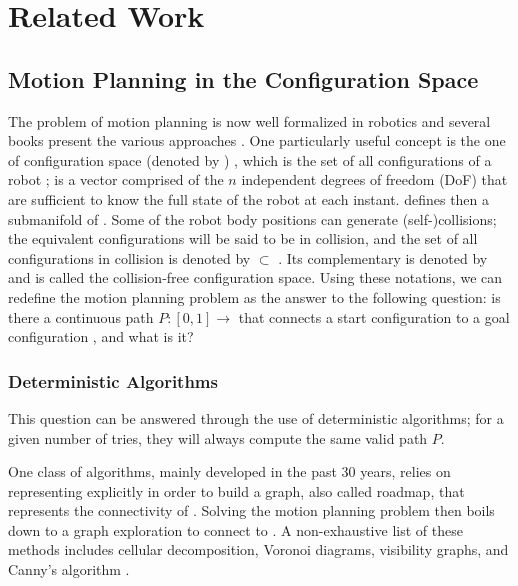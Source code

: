 \section{Related Work}
\label{sec:chap1-related-work}

\subsection{Motion Planning in the Configuration Space}
\label{subsec:chap1-motion-planning}

The problem of motion planning is now well formalized in robotics and
several books present the various approaches
\cite{lato91,chos05,lava06}. One particularly useful concept is the
one of configuration space (denoted by \cspace) \cite{loza83}, which
is the set of all configurations \config{} of a robot \robot; \config{} is
a vector comprised of the $n$ independent degrees of freedom (DoF)
that are sufficient to know the full state of the robot at each
instant. \cspace defines then a submanifold of \espace. Some of the
robot body positions can generate (self-)collisions; the equivalent
configurations will be said to be in collision, and the set of all
configurations in collision is denoted by \cobs $\subset$ \cspace. Its
complementary is denoted by \cfree and is called the collision-free
configuration space. Using these notations, we can redefine the motion
planning problem as the answer to the following question: is there a
continuous path $P: [0,1] \rightarrow$ \cfree that connects a start
configuration  to a goal configuration , and what
is it?

\subsubsection{Deterministic Algorithms}
\label{subsubsec:chap1-deterministic algorithms}

This question can be answered through the use of deterministic
algorithms; for a given number of tries, they will always compute the
same valid path $P$.

One class of algorithms, mainly developed in the past 30 years, relies
on representing \cobs explicitly in order to build a graph, also
called roadmap, that represents the connectivity of \cfree. Solving
the motion planning problem then boils down to a graph exploration to
connect  to . A non-exhaustive list of these
methods includes cellular decomposition, Voronoi diagrams, visibility
graphs, and Canny's algorithm \cite{good04}.

